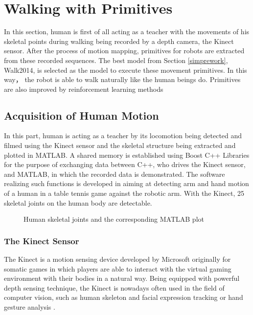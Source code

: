 \section{Walking with Primitives}
\label{walkingwithprimitives}
In this section, human is first of all acting as a teacher with the movements of his skeletal points during walking being recorded by a depth camera, the Kinect sensor. After the process of motion mapping, primitives for robots are extracted from these recorded sequences. The best model from Section {\ref{simprework}}, Walk2014, is selected as the model to execute these movement primitives. In this way， the robot is able to walk naturally like the human beings do. Primitives are also improved by reinforcement learning methods
\subsection{Acquisition of Human Motion}
In this part, human is acting as a teacher by its locomotion being detected and filmed using the Kinect sensor and the skeletal structure being extracted and plotted in MATLAB. A shared memory is established using Boost C++ Libraries for the purpose of exchanging data between C++, who drives the Kinect sensor, and MATLAB, in which the recorded data is demonstrated. The software realizing such functions is developed in \cite{Ga17a} aiming at detecting arm and hand motion of a human in a table tennis game against the robotic arm. With the Kinect, 25 skeletal joints on the human body are detectable.



\begin{figure}[H]
	\centering
	\qquad      
	\caption{Human skeletal joints and the corresponding MATLAB plot}
\end{figure} 


\subsubsection{The Kinect Sensor}
The Kinect is a motion sensing device developed by Microsoft originally for somatic games in which players are able to interact with the virtual gaming environment with their bodies in a natural way. Being equipped with powerful depth sensing technique, the Kinect is nowadays often used in the field of computer vision, such as human skeleton and facial expression tracking \cite{zhang2012microsoft} or hand gesture analysis \cite{han2013enhanced}.
 
